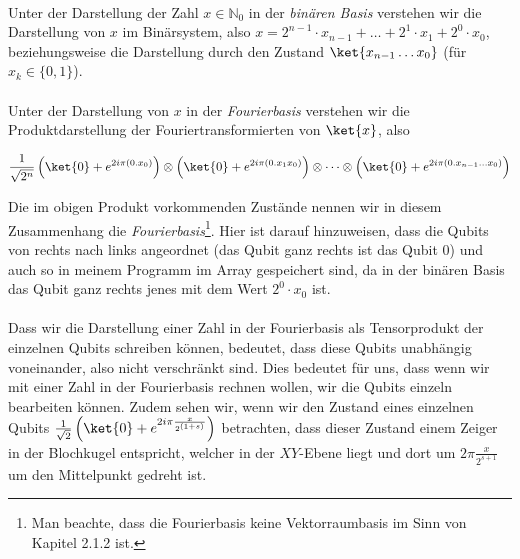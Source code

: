 \paragraph{}

Unter der Darstellung der Zahl $x \in \mathbb{N}_0$ in der \textit{binären Basis} verstehen wir die Darstellung von $x$ im Binärsystem, also $x = 2^{n - 1}\cdot x_{n - 1} + \dots + 2^1 \cdot x_1 + 2^0 \cdot x_0$, beziehungsweise die Darstellung durch den Zustand $\ket{x_{n - 1}\dots x_0}$ (für $x_k \in \{0, 1\}$).
\paragraph{}
Unter der Darstellung von $x$ in der \textit{Fourierbasis} verstehen wir die Produktdarstellung der Fouriertransformierten von $\ket{x}$, also 

$$\frac{1}{\sqrt{2^n}}\left(\ket{0} + e^{2i\pi(0.x_0)}\right)\otimes\left(\ket{0} + e^{2i\pi(0.x_1x_0)}\right)\otimes \dots \otimes \left(\ket{0} + e^{2i\pi(0.x_{n - 1}\dots x_0)}\right)$$

Die im obigen Produkt vorkommenden Zustände nennen wir in diesem Zusammenhang die \textit{Fourierbasis}\footnote{Man beachte, dass die Fourierbasis keine Vektorraumbasis im Sinn von Kapitel 2.1.2 ist.}. Hier ist darauf hinzuweisen, dass die Qubits von rechts nach links angeordnet (das Qubit ganz rechts ist das Qubit $0$) und auch so in meinem Programm im Array gespeichert sind, da in der binären Basis das Qubit ganz rechts jenes mit dem Wert $2^0 \cdot x_0$ ist.

\paragraph{}

Dass wir die Darstellung einer Zahl in der Fourierbasis als Tensorprodukt der einzelnen Qubits schreiben können, bedeutet, dass diese Qubits unabhängig voneinander, also nicht verschränkt sind. Dies bedeutet für uns, dass wenn wir mit einer Zahl in der Fourierbasis rechnen wollen, wir die Qubits einzeln bearbeiten können. Zudem sehen wir, wenn wir den Zustand eines einzelnen Qubits $\frac{1}{\sqrt{2}}\left(\ket{0} + e^{2i\pi\frac{x}{2^{(1 + s)}}}\right)$ betrachten, dass dieser Zustand einem Zeiger in der Blochkugel entspricht, welcher in der $XY$-Ebene liegt und dort um $2\pi\frac{x}{2^{s + 1}}$ um den Mittelpunkt gedreht ist.


